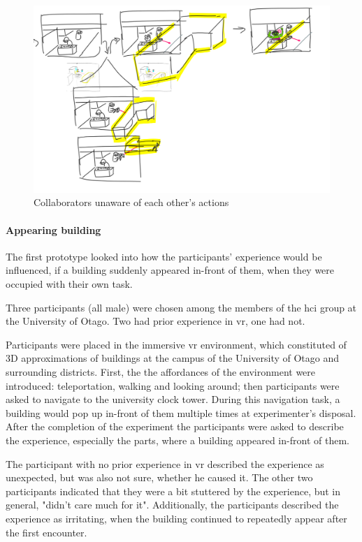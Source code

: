 \begin{figure}
	\centering
	\includegraphics[width=0.7\linewidth]{figures/placeholders/A1_unaware_of_A2_actions}
	\caption{Collaborators unaware of each other's actions}
	\label{fig:a1unawareofa2actions}
\end{figure}

\paragraph{Appearing building} 
\label{par:appearing_building}
The first prototype looked into how the participants' experience would be influenced, if a building suddenly appeared in-front of them, when they were occupied with their own task.

Three participants (all male) were chosen among the members of the \gls{hci} group at the University of Otago. Two had prior experience in \gls{vr}, one had not.

Participants were placed in the immersive \gls{vr} environment, which constituted of 3D approximations of buildings at the campus of the University of Otago and surrounding districts. First, the the affordances of the environment were introduced: teleportation, walking and looking around; then participants were asked to navigate to the university clock tower. During this navigation task, a building would pop up in-front of them multiple times at experimenter's disposal. After the completion of the experiment the participants were asked to describe the experience, especially the parts, where a building appeared in-front of them.


The participant with no prior experience in \gls{vr} described the experience as unexpected, but was also not sure, whether he caused it. The other two participants indicated that they were a bit stuttered by the experience, but in general, "didn't care much for it". Additionally, the participants described the experience as irritating, when the building continued to repeatedly appear after the first encounter.

